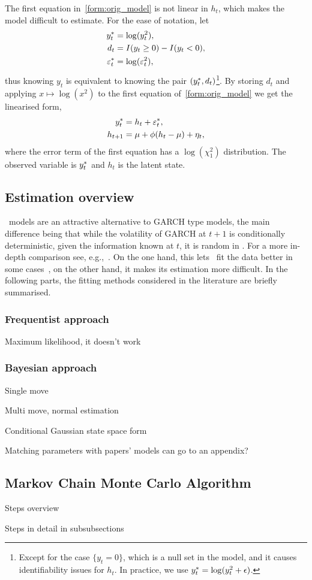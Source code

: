 The first equation in~\eqref{form:orig_model} is not linear in $h_t$, which makes the model difficult to estimate. For the ease of notation, let
\begin{align*}
y_t^\ast &=\log(y^2_t), \\
d_t &=I(y_t\ge0)-I(y_t<0), \\
\varepsilon_t^\ast &=\log(\varepsilon^2_t),
\end{align*}
thus knowing $y_t$ is equivalent to knowing the pair $(y_t^\ast, d_t)$\footnote{Except for the case $\{y_t=0\}$, which is a null set in the model, and it causes identifiability issues for $h_t$. In practice, we use $y_t^\ast =\log(y^2_t+\epsilon)$.}. By storing $d_t$ and applying $x\mapsto\log(x^2)$ to the first equation of~\eqref{form:orig_model} we get the linearised form,
\begin{align}
\begin{split}\label{form:lin_model}
y_t^\ast & = h_t+\varepsilon_t^\ast, \\
h_{t+1} & = \mu+\phi(h_t-\mu)+\eta_t,
\end{split}
\end{align}
where the error term of the first equation has a $\log(\chi_1^2)$ distribution. The observed variable is $y_t^\ast$ and $h_t$ is the latent state.

\subsection{Estimation overview}

\SV~models are an attractive alternative to GARCH type models, the main difference being that while the volatility of GARCH at $t+1$ is conditionally deterministic, given the information known at $t$, it is random in \SV.
For a more in-depth comparison see, e.g.,~\citet{Harvey1994}.
On the one hand, this lets \SV~fit the data better in some cases~\citep{Kim1998,Chan2016}, on the other hand, it makes its estimation more difficult. In the following parts, the fitting methods considered in the literature are briefly summarised.

\subsubsection{Frequentist approach}

Maximum likelihood, it doesn't work

\subsubsection{Bayesian approach}

Single move

Multi move, normal estimation

Conditional Gaussian state space form

Matching parameters with papers' models can go to an appendix?

\subsection[MCMC Algorithm]{Markov Chain Monte Carlo Algorithm}

Steps overview

Steps in detail in subsubsections